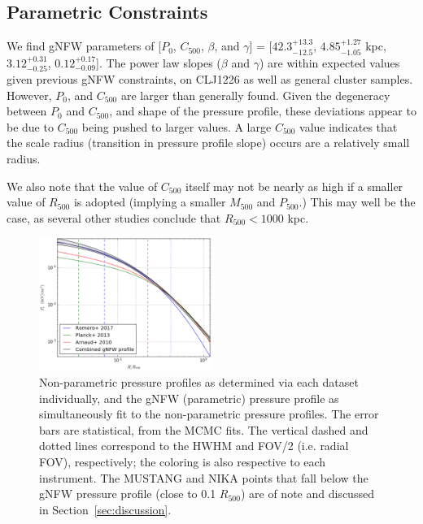 \documentclass[iop,numberedappendix,apj]{emulateapj}
\begin{document}

\subsection{Parametric Constraints}

We find gNFW parameters of [$P_0$, $C_{500}$, $\beta$, and $\gamma$] =
[$42.3_{-12.5}^{+13.3}$, $4.85_{-1.05}^{+1.27}$ kpc, $3.12_{-0.25}^{+0.31}$, $0.12_{-0.09}^{+0.17}$].
The power law slopes ($\beta$ and $\gamma$) are within expected values given previous gNFW constraints,
on CLJ1226 as well as general cluster samples. However, $P_0$, and $C_{500}$ are larger than generally
found. Given the degeneracy between $P_0$ and $C_{500}$, and shape of the pressure profile, these deviations
appear to be due to $C_{500}$ being pushed to larger values. A large $C_{500}$ value indicates that the
scale radius (transition in pressure profile slope) occurs are a relatively small radius.

We also note that the value of $C_{500}$ itself may not be nearly as high if a smaller value of $R_{500}$
is adopted (implying a smaller $M_{500}$ and $P_{500}$.) This may well be the case, as several other
studies conclude that $R_{500} < 1000$ kpc.

\begin{figure}[!h]
  \centering
  \includegraphics[width=0.5\textwidth]{NIKA_ml_deproj_figs/Real_Joint_gNFW_Real_11011111_2500S_500B_100W_gNFW_pressure.eps}
  \caption{Non-parametric pressure profiles as determined via each dataset individually, and the gNFW (parametric)
    pressure profile as simultaneously fit to the non-parametric pressure profiles. The error bars are statistical,
    from the MCMC fits. The vertical dashed and dotted
    lines correspond to the HWHM and FOV/2 (i.e. radial FOV), respectively; the coloring is also respective to each
    instrument. The MUSTANG and NIKA points that fall below the gNFW pressure profile (close to 0.1 $R_{500}$) are of
    note and discussed in Section~\ref{sec:discussion}.}
  \label{fig:joint_pressure}
\end{figure}
\end{document}
